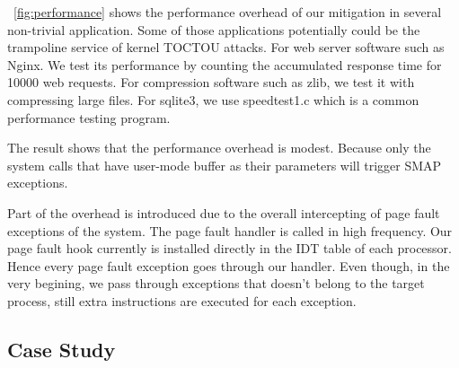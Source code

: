 ~\autoref{fig:performance} shows the performance overhead of our mitigation in several non-trivial application. Some of those applications potentially could be the trampoline service of kernel TOCTOU attacks.
For web server software such as Nginx. We test its performance by counting the accumulated response time for 10000 web requests. For compression software such as zlib, we test it with compressing large files. For sqlite3, we use speedtest1.c which is a common performance testing program.

The result shows that the performance overhead is modest. Because only the system calls that have user-mode buffer as their parameters will trigger SMAP exceptions. 




Part of the overhead is introduced due to the overall intercepting of page fault exceptions of the system. The page fault handler is called in high frequency. Our page fault hook currently is installed directly in the IDT table of each processor. Hence every page fault exception goes through our handler. Even though, in the very begining, we pass through exceptions that doesn't belong to the target process, still extra instructions are executed for each exception.


\subsection{Case Study}

